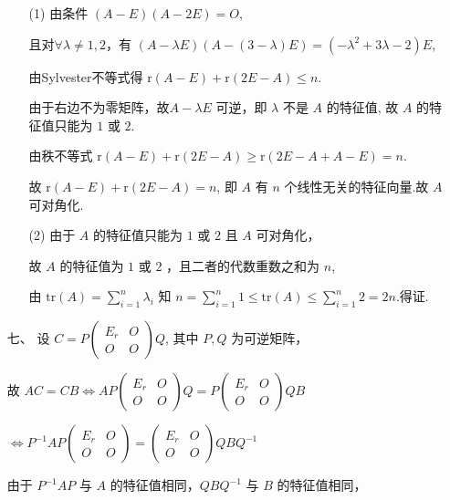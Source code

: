 \documentclass{ctexbook}
\begin{document}
\begin{enumerate}
    \begin{enumerate}
        \item[(1)] 由条件 \(\left(A-E\right)\left(A-2E\right)=O\),\par
        且对\(\forall \lambda \neq 1,2\)，有 \(\left(A-\lambda E\right)\left(A-\left(3-\lambda\right)E\right)=\left(-\lambda^2+3\lambda-2\right)E\),\par
        由Sylvester不等式得 \(\mathrm{r}(A-E)+\mathrm{r}(2E-A) \leq n\). \par
        由于右边不为零矩阵，故\(A-\lambda E\) 可逆，即 \(\lambda\) 不是 \(A\) 的特征值,
        故 \(A\) 的特征值只能为 \(1\) 或 \(2\).\par
        由秩不等式 \(\mathrm{r}(A-E)+\mathrm{r}(2E-A)\geq \mathrm{r}(2E-A + A-E)=n\). \par
        故 \(\mathrm{r}(A-E)+\mathrm{r}(2E-A)=n\), 即 \(A\) 有 \(n\) 个线性无关的特征向量.故 \(A\) 可对角化.
        \item[(2)] 由于 \(A\) 的特征值只能为 \(1\) 或 \(2\) 且 \(A\) 可对角化，\par
        故 \(A\) 的特征值为 \(1\) 或 \(2\) ，且二者的代数重数之和为 \(n\),\par
        由 \(\mathrm{tr}(A)=\sum\limits_{i=1}^n \lambda_i\) 知 \(n=\sum\limits_{i=1}^n 1 \leq \mathrm{tr}(A) \leq \sum\limits_{i=1}^n 2=2n\).得证.
    \end{enumerate}
    \item[七、]
    设 \(C=P\begin{pmatrix}
        E_r & O\\
        O & O
        \end{pmatrix}Q\), 其中 \(P,Q\) 为可逆矩阵，\par
    故 \(AC=CB \Leftrightarrow AP\begin{pmatrix}E_r & O\\O & O\end{pmatrix}Q=P\begin{pmatrix}E_r & O\\O & O\end{pmatrix}QB\)\par
    \(\Leftrightarrow P^{-1}AP\begin{pmatrix}E_r & O\\O & O\end{pmatrix}=\begin{pmatrix}E_r & O\\O & O\end{pmatrix}QBQ^{-1}\) \par
    由于 \(P^{-1}AP\) 与 \(A\) 的特征值相同，\(QBQ^{-1}\) 与 \(B\) 的特征值相同，\par

\end{enumerate}
\end{document}

